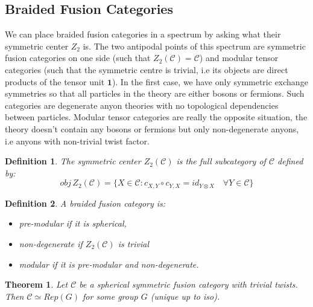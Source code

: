 \documentclass{article}
\newtheorem{definition}{Definition}
\newtheorem{theorem}{Theorem}
\begin{document}
\subsection{Braided Fusion Categories}

We can place braided fusion categories in a spectrum by asking what their symmetric center $Z_2$ is. The two antipodal points of this spectrum are symmetric fusion categories on one side (such that $Z_2(\mathcal{C})=\mathcal{C}$) and modular tensor categories (such that the symmetric centre is trivial, i.e its objects are direct products of the tensor unit $\mathbf{1}$). In the first case, we have only symmetric exchange symmetries so that all particles in the theory are either bosons or fermions. Such categories are degenerate anyon theories with no topological dependencies between particles. Modular tensor categories are really the opposite situation, the theory doesn't contain any bosons or fermions but only non-degenerate anyons, i.e anyons with non-trivial twist factor.

\begin{definition}
	The symmetric center $Z_2(\mathcal{C})$ is the full subcategory of $\mathcal{C}$ defined by:
	$$ obj \, Z_2(\mathcal{C}) = \{ X\in \mathcal{C} : c_{X,Y} \circ c_{Y,X} = id_{Y\otimes X} \quad \forall Y \in \mathcal{C} \} $$
\end{definition}
\begin{definition}
	A braided fusion category is:
	\begin{itemize}
		\item pre-modular if it is spherical,
		\item non-degenerate if $Z_2(\mathcal{C})$ is trivial
		\item modular if it is pre-modular and non-degenerate.
	\end{itemize}
\end{definition}

\begin{theorem}
	Let $\mathcal{C}$ be a spherical symmetric fusion category with trivial twists. Then $\mathcal{C} \simeq Rep(G)$ for some group $G$ (unique up to iso).
\end{theorem}
\end{document}

